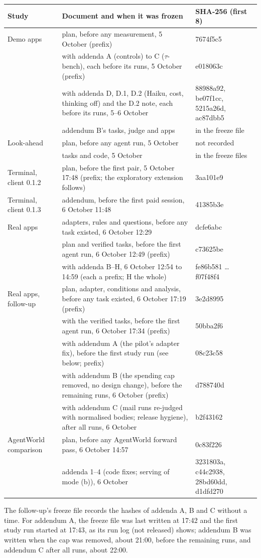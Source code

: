 \documentclass[11pt]{article}
\begin{document}
\begin{center}\footnotesize
\begin{tabular}{p{3.6cm}p{7.4cm}p{3.4cm}}
\toprule
Study & Document and when it was frozen & SHA-256 (first 8) \\
\midrule
Demo apps & plan, before any measurement, 5 October (prefix) & 7674f5c5 \\
 & with addenda A (controls) to C ($\tau$-bench), each before its runs, 5 October (prefix) & e018063c \\
 & with addenda D, D.1, D.2 (Haiku, cost, thinking off) and the D.2 note, each before its runs, 5--6 October & 88988a92, be07f1cc, 5215a26d, ac87dbb5 \\
 & addendum B's tasks, judge and apps & in the freeze file \\
Look-ahead & plan, before any agent run, 5 October & not recorded \\
 & tasks and code, 5 October & in the freeze files \\
Terminal, client 0.1.2 & plan, before the first pair, 5 October 17:48 (prefix; the exploratory extension follows) & 3aa101e9 \\
Terminal, client 0.1.3 & addendum, before the first paid session, 6 October 11:48 & 41385b3e \\
Real apps & adapters, rules and questions, before any task existed, 6 October 12:29 & dcfe6abc \\
 & plan and verified tasks, before the first agent run, 6 October 12:49 (prefix) & c73625be \\
 & with addenda B--H, 6 October 12:54 to 14:59 (each a prefix; H the whole) & fe86b581 \ldots{} f07f48f4 \\
Real apps, follow-up & plan, adapter, conditions and analysis, before any task existed, 6 October 17:19 (prefix) & 3e2d8995 \\
 & with the verified tasks, before the first agent run, 6 October 17:34 (prefix) & 50bba2f6 \\
 & with addendum A (the pilot's adapter fix), before the first study run (see below; prefix) & 08c23c58 \\
 & with addendum B (the spending cap removed, no design change), before the remaining runs, 6 October (prefix) & d788740d \\
 & with addendum C (mail runs re-judged with normalised bodies; release hygiene), after all runs, 6 October & b2f43162 \\
AgentWorld comparison & plan, before any AgentWorld forward pass, 6 October 14:57 & 0c83f226 \\
 & addenda 1--4 (code fixes; serving of mode (b)), 6 October & 3231803a, c44c2938, 28bd60dd, d1dfd270 \\
\bottomrule
\end{tabular}
\end{center}
The follow-up's freeze file records the hashes of addenda A, B and C without a time. For addendum A, the freeze file was
last written at 17:42 and the first study run started at 17:43, as its run log (not released) shows; addendum B was written
when the cap was removed, about 21:00, before the remaining runs, and addendum C after all runs, about 22:00.
\end{document}
